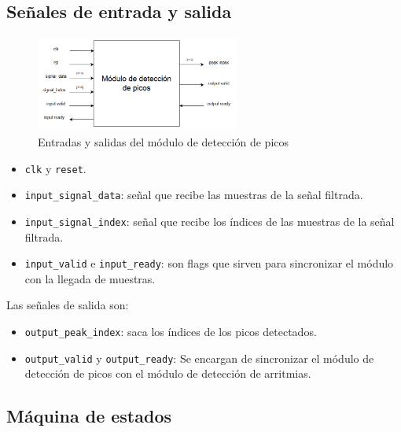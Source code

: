 \subsection{Señales de entrada y salida}

    \begin{figure}[h!]
        \centering
        \includegraphics[width=0.6\textwidth]{./Images/img_implementacion_hw/diagramamodulodeteccionpicos.png}
        \caption{Entradas y salidas del módulo de detección de picos}
        \label{fig:moddeteccionpicos}
    \end{figure} 
    
    \begin{itemize}
    \item \texttt{clk} y \texttt{reset}.
    \item \texttt{input\_signal\_data}: señal que recibe las muestras de la señal filtrada.
    \item \texttt{input\_signal\_index}: señal que recibe los índices de las muestras de la señal filtrada.
    \item \texttt{input\_valid} e \texttt{input\_ready}: son flags que sirven para sincronizar el módulo con la llegada de muestras. 
    \end{itemize}
    
    Las señales de salida son:
    
    \begin{itemize}
        \item \texttt{output\_peak\_index}: saca los índices de los picos detectados.
        \item \texttt{output\_valid} y \texttt{output\_ready}: Se encargan de sincronizar el módulo de detección de picos 
        con el módulo de detección de arritmias.
    \end{itemize}

\subsection{Máquina de estados}

